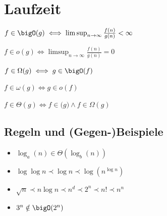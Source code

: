 \section*{Laufzeit}
$f \in\bigO(g) \iff \limsup_{n\to\infty}\frac{f(n)}{g(n)} < \infty$

$f \in o(g) \iff \limsup_{n\to\infty}\frac{f(n)}{g(n)} = 0$

$f \in\Omega(g) \iff g \in \bigO(f)$

$f \in \omega(g) \iff g\in o(f)$

$f \in \Theta(g) \iff f\in\big(g) \land f \in\Omega(g)$

\subsection*{Regeln und (Gegen-)Beispiele}
\begin{itemize}
	\item $\log_a(n) \in \Theta(\log_b(n))$
	\item $\log\log n \prec \log n \prec \log(n^{\log n})$
	\item $\sqrt{n} \prec n\log n \prec n^d \prec 2^n \prec n! \prec n^n$
	\item $3^n \notin \bigO(2^n)$
\end{itemize}

